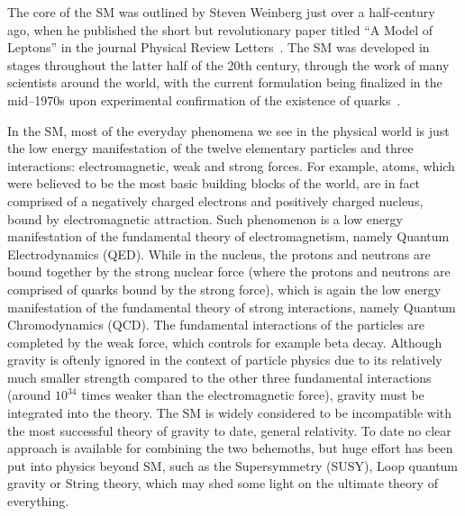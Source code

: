 \label{sec:SM}
The core of the SM was outlined by Steven Weinberg just over a half-century ago, 
when he published the short but revolutionary paper titled ``A Model of Leptons'' 
in the journal Physical Review Letters~\cite{SMcore}.
The SM was developed in stages throughout the latter half of the 20th century, 
through the work of many scientists around the world,
with the current formulation being finalized in the mid--1970s upon 
experimental confirmation of the existence of quarks~\cite{observation-qurak1, observation-qurak2}.

In the SM, most of the everyday phenomena we see in the physical world is just the low energy 
manifestation of the twelve elementary particles and three interactions:
electromagnetic, weak and strong forces. 
For example, atoms, which were believed to be the most basic building blocks of the world, 
are in fact comprised of a negatively charged electrons and positively charged nucleus, bound by
electromagnetic attraction. Such phenomenon is a low energy manifestation of the fundamental
theory of electromagnetism, namely Quantum Electrodynamics (QED). 
While in the nucleus, the protons and neutrons are bound together by the strong nuclear force 
(where the protons and neutrons are comprised of quarks bound by the strong force), 
which is again the low energy manifestation of the fundamental theory of strong interactions, 
namely Quantum Chromodynamics (QCD). 
The fundamental interactions of the particles are completed by the weak force, 
which controls for example beta decay.
Although gravity is oftenly ignored in the context of particle physics due to its
relatively much smaller strength compared to the other three fundamental interactions (around $10^{34}$ times
weaker than the electromagnetic force),
gravity must be integrated into the theory. 
The SM is widely considered to be incompatible with the 
most successful theory of gravity to date, general relativity.
To date no clear approach is available for combining the two behemoths, 
but huge effort has been put into physics beyond SM, such as the 
Supersymmetry (SUSY), Loop quantum gravity or String theory, which may shed some light on the
ultimate theory of everything. 

